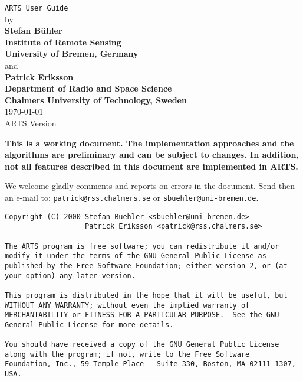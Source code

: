   




%



%
%
\thispagestyle{plain}
\begin{center}
  \vspace*{2cm}
  {\Huge \verb|ARTS User Guide|\\}
  \vspace*{1cm}
  {\large by \\}
  \vspace*{1cm}
  {\large \bf Stefan B\"uhler\\Institute of Remote Sensing\\University of Bremen, Germany\\}
  \vspace*{3mm}
  {\large and\\}
  \vspace*{3mm}
  {\large \bf Patrick Eriksson\\Department of Radio and Space Science\\Chalmers University of Technology, Sweden\\}
  \vspace*{2cm}
  {\large \today\\
    ARTS Version }
\end{center}
  \vspace*{4cm}
{\large \bf
  \noindent
  This is a working document. The implementation approaches and the
  algorithms are preliminary and can be subject to changes. In addition,
  not all features described in this document are implemented in ARTS.
  
  We welcome gladly comments and reports on errors in the document.
  Send then an e-mail to: \verb|patrick@rss.chalmers.se| or 
  \verb|sbuehler@uni-bremen.de|.
}

\newpage                          
\thispagestyle{empty}
\vspace*{\fill}
\begin{verbatim}
Copyright (C) 2000 Stefan Buehler <sbuehler@uni-bremen.de>
                   Patrick Eriksson <patrick@rss.chalmers.se>

The ARTS program is free software; you can redistribute it and/or
modify it under the terms of the GNU General Public License as
published by the Free Software Foundation; either version 2, or (at
your option) any later version.

This program is distributed in the hope that it will be useful, but
WITHOUT ANY WARRANTY; without even the implied warranty of
MERCHANTABILITY or FITNESS FOR A PARTICULAR PURPOSE.  See the GNU
General Public License for more details.

You should have received a copy of the GNU General Public License
along with the program; if not, write to the Free Software 
Foundation, Inc., 59 Temple Place - Suite 330, Boston, MA 02111-1307,
USA. 
\end{verbatim}
\cleardoublepage

